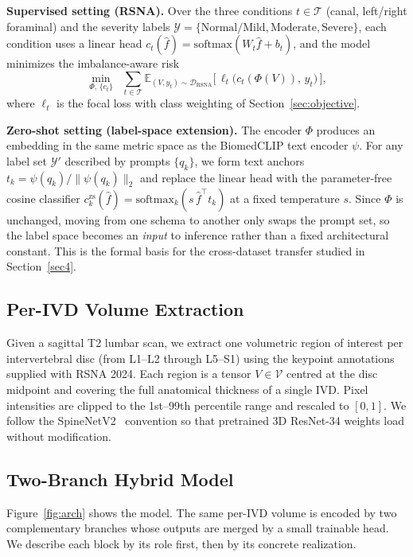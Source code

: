 \documentclass[runningheads]{llncs}
\begin{document}
\textbf{Supervised setting (RSNA).} Over the three conditions $t \in \mathcal{T}$ (canal, left/right foraminal) and the severity labels $\mathcal{Y} = \{\text{Normal/Mild},\text{Moderate},\text{Severe}\}$, each condition uses a linear head $c_t(\hat f) = \mathrm{softmax}(W_t \hat f + b_t)$, and the model minimizes the imbalance-aware risk
\begin{equation}
\min_{\Phi,\,\{c_t\}} \;\; \sum_{t \in \mathcal{T}} \mathbb{E}_{(V, y_t) \sim \mathcal{D}_{\text{RSNA}}} \big[\, \ell_t\big(c_t(\Phi(V)),\, y_t\big)\,\big],
\label{eq:erm}
\end{equation}
where $\ell_t$ is the focal loss with class weighting of Section~\ref{sec:objective}.

\textbf{Zero-shot setting (label-space extension).} The encoder $\Phi$ produces an embedding in the same metric space as the BiomedCLIP text encoder $\psi$. For any label set $\mathcal{Y}'$ described by prompts $\{q_k\}$, we form text anchors $t_k = \psi(q_k)/\|\psi(q_k)\|_2$ and replace the linear head with the parameter-free cosine classifier $c^{\text{zs}}_k(\hat f) = \mathrm{softmax}_k(s\,\hat f^{\top} t_k)$ at a fixed temperature $s$. Since $\Phi$ is unchanged, moving from one schema to another only swaps the prompt set, so the label space becomes an \emph{input} to inference rather than a fixed architectural constant. This is the formal basis for the cross-dataset transfer studied in Section~\ref{sec4}.

\subsection{Per-IVD Volume Extraction}

Given a sagittal T2 lumbar scan, we extract one volumetric region of interest per intervertebral disc (from L1--L2 through L5--S1) using the keypoint annotations supplied with RSNA 2024. Each region is a tensor $V \in \mathcal{V}$ centred at the disc midpoint and covering the full anatomical thickness of a single IVD. Pixel intensities are clipped to the 1st--99th percentile range and rescaled to $[0, 1]$. We follow the SpineNetV2~\cite{windsor2022} convention so that pretrained 3D ResNet-34 weights load without modification.

\subsection{Two-Branch Hybrid Model}\label{wf}

Figure~\ref{fig:arch} shows the model. The same per-IVD volume is encoded by two complementary branches whose outputs are merged by a small trainable head. We describe each block by its role first, then by its concrete realization.
\end{document}
